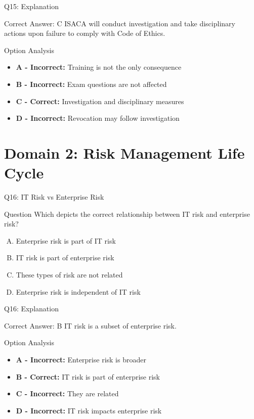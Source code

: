 \documentclass{beamer}
\begin{document}
	\begin{frame}{Q15: Explanation}
		\begin{block}{Correct Answer: C}
			ISACA will conduct investigation and take disciplinary actions upon failure to comply with Code of Ethics.
		\end{block}
		\begin{block}{Option Analysis}
			\begin{itemize}
				\item \textbf{A - Incorrect:} Training is not the only consequence
				\item \textbf{B - Incorrect:} Exam questions are not affected
				\item \textbf{C - Correct:} Investigation and disciplinary measures
				\item \textbf{D - Incorrect:} Revocation may follow investigation
			\end{itemize}
		\end{block}
	\end{frame}
	
	
	\section{Domain 2: Risk Management Life Cycle}
	
	\begin{frame}{Q16: IT Risk vs Enterprise Risk}
		\begin{block}{Question}
			Which depicts the correct relationship between IT risk and enterprise risk?
		\end{block}
		\begin{enumerate}[(A)]
			\item Enterprise risk is part of IT risk
			\item IT risk is part of enterprise risk
			\item These types of risk are not related
			\item Enterprise risk is independent of IT risk
		\end{enumerate}
	\end{frame}
	
	\begin{frame}{Q16: Explanation}
		\begin{block}{Correct Answer: B}
			IT risk is a subset of enterprise risk.
		\end{block}
		\begin{block}{Option Analysis}
			\begin{itemize}
				\item \textbf{A - Incorrect:} Enterprise risk is broader
				\item \textbf{B - Correct:} IT risk is part of enterprise risk
				\item \textbf{C - Incorrect:} They are related
				\item \textbf{D - Incorrect:} IT risk impacts enterprise risk
			\end{itemize}
		\end{block}
	\end{frame}
	
\end{document}
